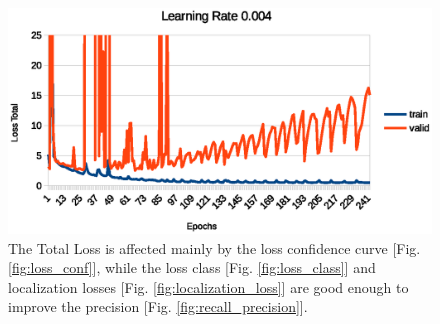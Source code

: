 \documentclass[10pt,twocolumn,letterpaper]{article}
\begin{document}
\begin{figure}[t]
\begin{center}
   \includegraphics[width=1\linewidth]{loss_total.eps}
\end{center}
   \caption{The Total Loss is affected mainly by the loss confidence curve [Fig. \ref{fig:loss_conf}], 
while the loss class [Fig. \ref{fig:loss_class}] and localization losses [Fig. \ref{fig:localization_loss}] are good enough to improve the precision [Fig. \ref{fig:recall_precision}].}
\label{fig:loss_total}
\label{fig:onecol}
\end{figure}
\end{document}
